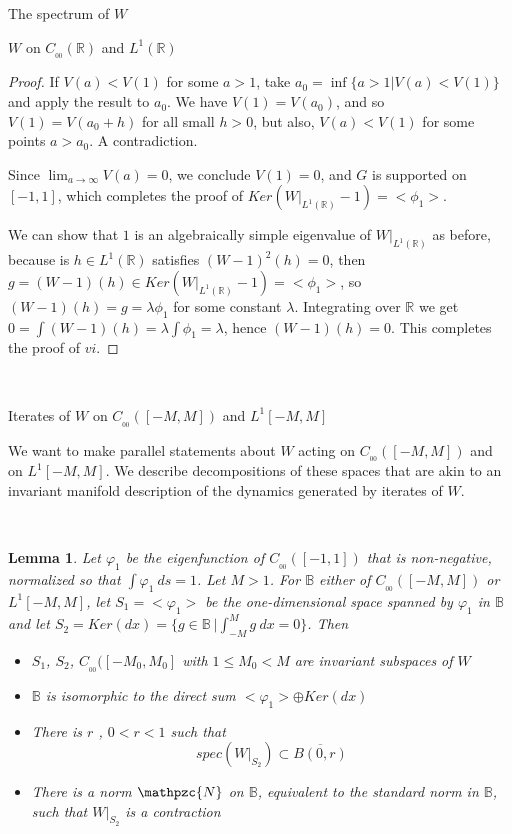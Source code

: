 \documentclass[12pt]{article}
\newtheorem{lemma}[theorem]{Lemma}
\begin{document}
\begin{section}{The spectrum of $W$ }
\begin{subsection}{$W$ on $C_{_{0\!0}}(\mathbb{R})$ and $L^1(\mathbb{R})$}
\begin{proof}
If $V(a) < V(1)$ for some $a>1$, take $a_0 = \inf \{a > 1| V(a) < V(1)\} $ and apply the result to $a_0$. We have $V(1) = V(a_0) $, and so $V(1)= V(a_0 + h)$ for all small $h > 0$, but also, $V(a) < V(1)$ for some points $a > a_0$. A contradiction.

Since $\lim_{a \rightarrow \infty } V(a) = 0$, we conclude $V(1)=0$, and $G$ is supported on $[-1,1]$, which completes the proof of $ Ker\left( W\Big|_{L^1(\mathbb{R})} - 1 \right) = <\phi_1>$.  

We can show that $1$ is an algebraically simple eigenvalue of $W\Big|_{L^1(\mathbb{R})}$ as before, because is $h \in L^1(\mathbb{R})$ satisfies $ (W -1)^2(h) = 0$, then $g = (W-1)(h) \in Ker\left( W\Big|_{L^1(\mathbb{R})} - 1 \right) = <\phi_1>$, so $(W-1)(h) = g = \lambda \phi_1$ for some constant $\lambda$. Integrating over $\mathbb{R}$ we get $0 = \int (W-1)(h) =  \lambda \int \phi_1 = \lambda $, hence $(W-1)(h) = 0$. This completes the proof of $vi$.
\end{proof}

\end{subsection}

\  
\  


\begin{subsection}{Iterates of $W$ on $C_{_{0\!0}}([-M,M])$ and $L^1[-M,M]$ }  

\hspace{20pt}We want to make parallel statements about $W$ acting on $C_{_{0\!0}}([-M,M])$ and on $L^1[-M,M]$. We describe decompositions of these spaces that are akin to an invariant manifold description of the dynamics generated by iterates of $W$. 
 
\


\begin{lemma} \label{lmm:iters}
Let $\varphi_1$ be the eigenfunction of $C_{_{0\!0}}([-1,1])$ that is non-negative, normalized so that $\int \varphi_1 \ ds =1$. Let $M>1$. For $\mathbb{B}$ either of $C_{_{0\!0}}([-M,M])$ or $L^1[-M,M]$, let $S_1 = <\varphi_1>$ be the one-dimensional space spanned by $\varphi_1$ in $\mathbb{B}$ and let $S_2 = Ker( dx) = \{g \in \mathbb{B} \ | \int_{-M}^{M} g \  dx = 0 \} $. Then
\begin{itemize}
	\item[i.] $S_1$, $S_2$, $C_{_{00}}([-M_0,M_0]$ with $1 \le M_0 < M$ are invariant subspaces of $W$
	\item[ii.] $\mathbb{B}$ is isomorphic to the direct sum $<\varphi_1> \oplus Ker( dx)$
	\item[iii.] There is $r$ , $ 0 < r < 1$ such that 
	$$
	spec(W\Big|_{S_2}) \subset \overline{B(0,r)}
	$$
	\item[iv.] There is a norm $\mathpzc{N}$ on $\mathbb{B}$, equivalent to the standard norm in $\mathbb{B}$, such that $W\Big|_{S_2}$ is a contraction 
\end{itemize}
\end{lemma}



\end{subsection}
\end{section}
\end{document}
